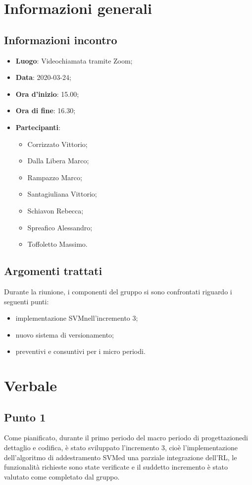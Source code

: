 \section{Informazioni generali}
    \subsection{Informazioni incontro}
        \begin{itemize}
            \item \textbf{Luogo}: Videochiamata tramite Zoom;
            \item \textbf{Data}: 2020-03-24;
            \item \textbf{Ora d'inizio}: 15.00;
            \item \textbf{Ora di fine}: 16.30;
            \item \textbf{Partecipanti}: \begin{itemize}
                \item Corrizzato Vittorio;
                \item Dalla Libera Marco;
                \item Rampazzo Marco;
                \item Santagiuliana Vittorio;
                \item Schiavon Rebecca;
                \item Spreafico Alessandro;
                \item Toffoletto Massimo.
            \end{itemize}
        \end{itemize}
    \subsection{Argomenti trattati}
        Durante la riunione, i componenti del gruppo si sono confrontati riguardo i seguenti punti:
		\begin{itemize}
			\item implementazione SVM\glosp nell'incremento 3;
			\item nuovo sistema di versionamento\glo;
			\item preventivi e consuntivi per i micro periodi.
		\end{itemize}
\section{Verbale}
    \subsection{Punto 1}
    Come pianificato, durante il primo periodo del macro periodo di progettazione\glosp di dettaglio e codifica, è stato sviluppato l'incremento 3, cioè l'implementazione dell'algoritmo di addestramento SVM\glo ed una parziale integrazione dell'RL\glo, le funzionalità richieste sono state verificate e il suddetto incremento è stato valutato come completato dal gruppo.
    
